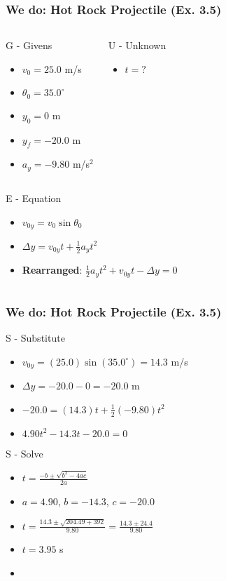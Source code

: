 \documentclass{beamer}
\begin{document}
\begin{frame}
\frametitle{We do: Hot Rock Projectile (Ex. 3.5)}
\pause
\begin{columns}[T]
\begin{block}{G - Givens}
\begin{itemize}
\item $v_0 = 25.0$ m/s
\item $\theta_0 = 35.0^\circ$
\item $y_0 = 0$ m
\item $y_f = -20.0$ m
\item $a_y = -9.80$ m/s$^2$
\end{itemize}
\end{block}
\pause
{}
\begin{block}{U - Unknown}
\begin{itemize}
\item $t = ?$
\end{itemize}
\end{block}
\end{columns}
\pause
\begin{columns}[T]
\begin{block}{E - Equation}
\begin{itemize}
\item $v_{0y} = v_0 \sin\theta_0$
\item $\Delta y = v_{0y}t + \frac{1}{2}a_y t^2$
\item \textbf{Rearranged}: $\frac{1}{2}a_y t^2 + v_{0y}t - \Delta y = 0$
\end{itemize}
\end{block}
\end{columns}
\end{frame}

\begin{frame}
\frametitle{We do: Hot Rock Projectile (Ex. 3.5)}

\begin{block}{S - Substitute}
\begin{itemize}
\item $v_{0y} = (25.0)\sin(35.0^\circ) = 14.3$ m/s
\item $\Delta y = -20.0 - 0 = -20.0$ m
\item $-20.0 = (14.3)t + \frac{1}{2}(-9.80)t^2$
\item $4.90t^2 - 14.3t - 20.0 = 0$
\end{itemize}
\end{block}
\pause
\begin{block}{S - Solve}
\begin{itemize}
\item $t = \frac{-b \pm \sqrt{b^2 - 4ac}}{2a}$
\item $a = 4.90$, $b = -14.3$, $c = -20.0$
\item $t = \frac{14.3 \pm \sqrt{204.49 + 392}}{9.80} = \frac{14.3 \pm 24.4}{9.80}$
\item $t = 3.95$ s
\item {}
\end{itemize}
\end{block}
\end{frame}
\end{document}
